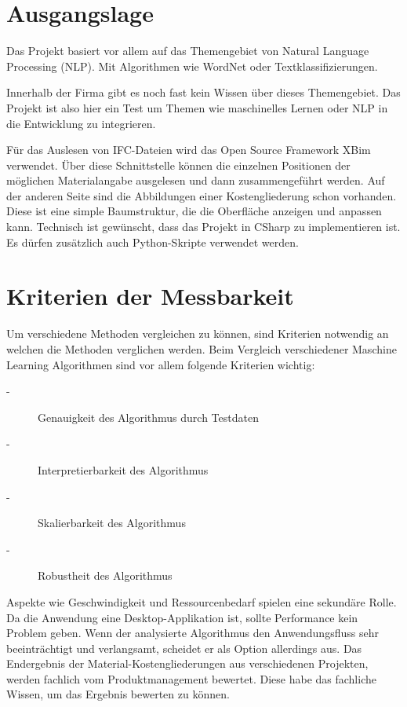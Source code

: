\begin{onehalfspace}
\section{Ausgangslage}

Das Projekt basiert vor allem auf das Themengebiet von Natural Language Processing (NLP). Mit Algorithmen wie WordNet oder Textklassifizierungen.

Innerhalb der Firma gibt es noch fast kein Wissen über dieses Themengebiet. Das Projekt ist also hier ein Test um Themen wie maschinelles Lernen oder NLP in die Entwicklung zu integrieren.

Für das Auslesen von IFC-Dateien wird das Open Source Framework XBim verwendet. Über diese Schnittstelle können die einzelnen Positionen der möglichen Materialangabe ausgelesen und dann zusammengeführt werden. Auf der anderen Seite sind die Abbildungen einer Kostengliederung schon vorhanden. Diese ist eine simple Baumstruktur, die die Oberfläche anzeigen und anpassen kann.
Technisch ist gewünscht, dass das Projekt in CSharp zu implementieren ist. Es dürfen zusätzlich auch Python-Skripte verwendet werden.

\section{Kriterien der Messbarkeit}

Um verschiedene Methoden vergleichen zu können, sind Kriterien notwendig an welchen die Methoden verglichen werden. Beim Vergleich verschiedener Maschine Learning Algorithmen sind vor allem folgende Kriterien wichtig:
\begin{description}
	\item[-] Genauigkeit des Algorithmus durch Testdaten
	\item[-] Interpretierbarkeit des Algorithmus
	\item[-] Skalierbarkeit des Algorithmus 
	\item[-] Robustheit des Algorithmus \cite{mic-ml-comparison}
\end{description}


Aspekte wie Geschwindigkeit und Ressourcenbedarf spielen eine sekundäre Rolle. Da die Anwendung eine Desktop-Applikation ist, sollte Performance kein Problem geben. Wenn der analysierte Algorithmus den Anwendungsfluss sehr beeinträchtigt und verlangsamt, scheidet er als Option allerdings aus.
Das Endergebnis der Material-Kostengliederungen aus verschiedenen Projekten, werden fachlich vom Produktmanagement bewertet. Diese habe das fachliche Wissen, um das Ergebnis bewerten zu können.


\end{onehalfspace}
